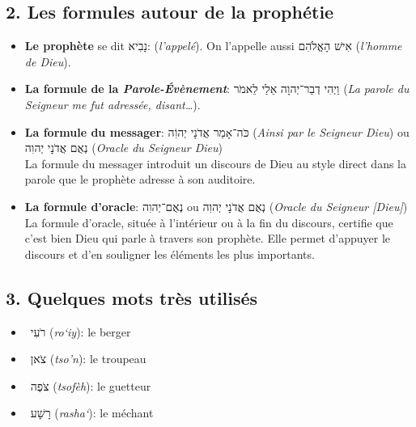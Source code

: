 \subsection*{2. Les formules autour de la prophétie}
\begin{itemize}[label=]
    \item \textbf{Le prophète} se dit \texthebrew{נָבִיא}: (\textit{l'appelé}). On l'appelle aussi \texthebrew{אִישׁ הָאֱלֹהִם} (\textit{l'homme de Dieu}).
    \item \textbf{La formule de la \textit{Parole-Évènement}}: \texthebrew{וַיְהִי דְבַר־יְהוָה אֵלַי לֵאמֹר} (\textit{La parole du Seigneur me fut adressée, disant…}).
    \item \textbf{La formule du messager}: \texthebrew{כֹּה־אָמַר אֲדֹנָי יְהוִֹה} (\textit{Ainsi par le Seigneur Dieu}) ou \texthebrew{נְאֻם אֲדֹנָי יְהוִה} (\textit{Oracle du Seigneur Dieu}) \\
          La formule du messager introduit un discours de Dieu au style direct dans la parole que le prophète adresse à son auditoire.
    \item \textbf{La formule d'oracle}: \texthebrew{נְאֻם־יְהוִה} ou \texthebrew{נְאֻם אֲדֹנָי יְהוִה} (\textit{Oracle du Seigneur [Dieu]})\\
          La formule d'oracle, située à l'intérieur ou à la fin du discours, certifie que c'est bien Dieu qui parle à travers son prophète. Elle permet d'appuyer le discours et d'en souligner les éléments les plus importants.
\end{itemize}

\subsection*{3. Quelques mots très utilisés}
\begin{itemize}[label=]
    \item ~\texthebrew{רֹעִי} (\textit{ro‘iy}): le berger
    \item ~\texthebrew{צֹאן} (\textit{tso'n}): le troupeau
    \item ~\texthebrew{צֹפֶה} (\textit{tsofèh}): le guetteur
    \item ~\texthebrew{רָשָׁע} (\textit{rasha‘}): le méchant
\end{itemize}